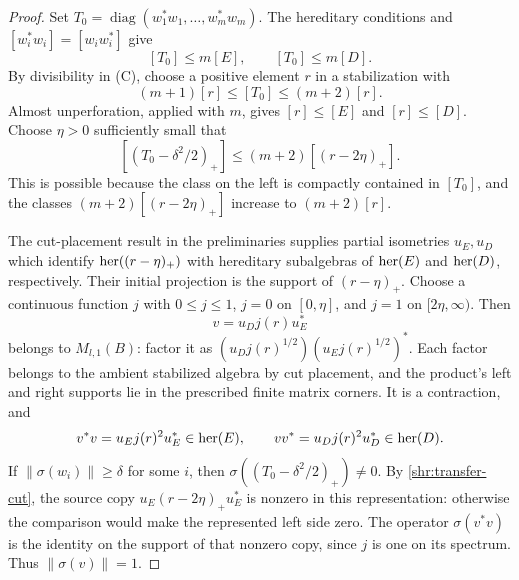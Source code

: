 \begin{proof}
Set $T_0=\operatorname{diag}(w_1^*w_1,\ldots,w_m^*w_m)$.  The hereditary
conditions and $[w_i^*w_i]=[w_iw_i^*]$ give
\[
 [T_0]\le m[E],\qquad [T_0]\le m[D].
\]
By divisibility in \textup{(C)}, choose a positive element $r$ in a
stabilization with
\[
 (m+1)[r]\le[T_0]\le(m+2)[r].
\]
Almost unperforation, applied with $m$, gives $[r]\le[E]$ and
$[r]\le[D]$.  Choose $\eta>0$ sufficiently small that
\begin{equation}\label{shr:transfer-cut}
 [(T_0-\delta^2/2)_+]\le(m+2)[(r-2\eta)_+].
\end{equation}
This is possible because the class on the left is compactly contained in
$[T_0]$, and the classes $(m+2)[(r-2\eta)_+]$ increase to $(m+2)[r]$.

The cut-placement result in the preliminaries supplies partial isometries
$u_E,u_D$ which identify $\operatorname{her}((r-\eta)_+)$ with hereditary subalgebras of
$\operatorname{her}(E)$ and $\operatorname{her}(D)$, respectively.  Their initial projection is the
support of $(r-\eta)_+$.  Choose a continuous function $j$ with
$0\le j\le1$, $j=0$ on $[0,\eta]$, and $j=1$ on $[2\eta,\infty)$.
Then
\[
 v=u_D j(r)u_E^*
\]
belongs to $M_{l,1}(B)$: factor it as
$(u_Dj(r)^{1/2})(u_Ej(r)^{1/2})^*$.  Each factor belongs to the ambient
stabilized algebra by cut placement, and the product's left and right
supports lie in the prescribed finite matrix corners.  It is a contraction, and
\[
 v^*v=u_Ej(r)^2u_E^*\in\operatorname{her}(E),\qquad
 vv^*=u_Dj(r)^2u_D^*\in\operatorname{her}(D).
\]
If $\|\sigma(w_i)\|\ge\delta$ for some $i$, then
$\sigma((T_0-\delta^2/2)_+)\ne0$.  By
\eqref{shr:transfer-cut}, the source copy
$u_E(r-2\eta)_+u_E^*$ is nonzero in this representation: otherwise the
comparison would make the represented left side zero.  The operator
$\sigma(v^*v)$ is the identity on the support of that nonzero copy, since
$j$ is one on its spectrum.  Thus $\|\sigma(v)\|=1$.
\end{proof}

